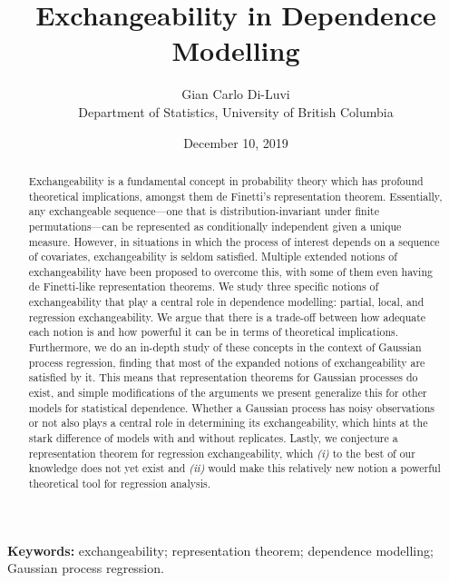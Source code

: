 \documentclass[10pt]{article}
\title{Exchangeability in Dependence Modelling} %
\author{Gian Carlo Di-Luvi 
\\
{\normalsize Department of Statistics, University of British Columbia}} %
\date{\normalsize December 10, 2019} %
\begin{document}
\maketitle
\thispagestyle{empty}

\vskip 0.5cm

\begin{abstract}
\noindent Exchangeability is a fundamental concept in probability theory which has profound theoretical implications, amongst them de Finetti's representation theorem. Essentially, any exchangeable sequence---one that is distribution-invariant under finite permutations---can be represented as conditionally independent given a unique measure. However, in situations in which the process of interest depends on a sequence of covariates, exchangeability is seldom satisfied. Multiple extended notions of exchangeability have been proposed to overcome this, with some of them even having de Finetti-like representation theorems. We study three specific notions of exchangeability that play a central role in dependence modelling: partial, local, and regression exchangeability. We argue that there is a trade-off between how adequate each notion is and how powerful it can be in terms of theoretical implications. Furthermore, we do an in-depth study of these concepts in the context of Gaussian process regression, finding that most of the expanded notions of exchangeability are satisfied by it. This means that representation theorems for Gaussian processes do exist, and simple modifications of the arguments we present generalize this for other models for statistical dependence. Whether a Gaussian process has noisy observations or not also plays a central role in determining its exchangeability, which hints at the stark difference of models with and without replicates. Lastly, we conjecture a representation theorem for regression exchangeability, which \textit{(i)} to the best of our knowledge does not yet exist and \textit{(ii)} would make this relatively new notion a powerful theoretical tool for regression analysis.
\end{abstract}

\textbf{Keywords:} exchangeability; representation theorem; dependence modelling; Gaussian process regression.




\cleardoublepage
\setcounter{page}{1}


\vskip 2cm

\end{document}
